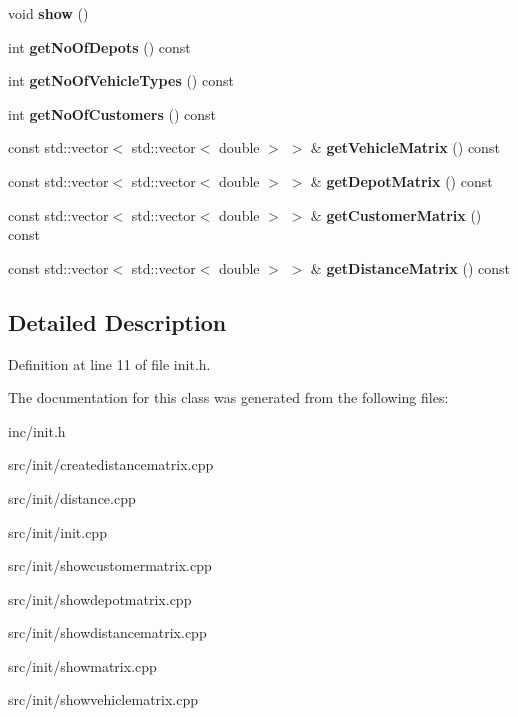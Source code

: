 \begin{DoxyCompactItemize}
\mbox{\label{class_init_a9f8816aee25eb57e9a8f133244fbffda}} 
void {\bfseries show} ()
\item 
\mbox{\label{class_init_ad6dd362eb2f7b5ac46af9666b7d920da}} 
int {\bfseries get\+No\+Of\+Depots} () const
\item 
\mbox{\label{class_init_a3589c9bb9d90429ca08c476163aa1b28}} 
int {\bfseries get\+No\+Of\+Vehicle\+Types} () const
\item 
\mbox{\label{class_init_aa734c4109c33931c0b038b622b867c18}} 
int {\bfseries get\+No\+Of\+Customers} () const
\item 
\mbox{\label{class_init_a50e5ae9da26f66e57b81e1cfda053dcb}} 
const std\+::vector$<$ std\+::vector$<$ double $>$ $>$ \& {\bfseries get\+Vehicle\+Matrix} () const
\item 
\mbox{\label{class_init_a8bccc72be332623cdc21c36085787fda}} 
const std\+::vector$<$ std\+::vector$<$ double $>$ $>$ \& {\bfseries get\+Depot\+Matrix} () const
\item 
\mbox{\label{class_init_a571046054e4cc1f40bba8fc2e952c213}} 
const std\+::vector$<$ std\+::vector$<$ double $>$ $>$ \& {\bfseries get\+Customer\+Matrix} () const
\item 
\mbox{\label{class_init_a023ffffca04fa97b54a847cb02b5d0c1}} 
const std\+::vector$<$ std\+::vector$<$ double $>$ $>$ \& {\bfseries get\+Distance\+Matrix} () const
\end{DoxyCompactItemize}


\subsection{Detailed Description}


Definition at line 11 of file init.\+h.



The documentation for this class was generated from the following files\+:\begin{DoxyCompactItemize}
\item 
inc/init.\+h\item 
src/init/createdistancematrix.\+cpp\item 
src/init/distance.\+cpp\item 
src/init/init.\+cpp\item 
src/init/showcustomermatrix.\+cpp\item 
src/init/showdepotmatrix.\+cpp\item 
src/init/showdistancematrix.\+cpp\item 
src/init/showmatrix.\+cpp\item 
src/init/showvehiclematrix.\+cpp\end{DoxyCompactItemize}
